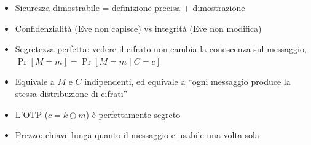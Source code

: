 \begin{itemize}
\tightlist
\item
  Sicurezza dimostrabile = definizione precisa + dimostrazione
\item
  Confidenzialità (Eve non capisce) vs integrità (Eve non modifica)
\item
  Segretezza perfetta: vedere il cifrato non cambia la conoscenza sul messaggio, \(\Pr[M = m] = \Pr[M = m \mid C = c]\)
\item
  Equivale a \(M\) e \(C\) indipendenti, ed equivale a ``ogni messaggio produce la stessa distribuzione di cifrati''
\item
  L'OTP (\(c = k \oplus m\)) è perfettamente segreto
\item
  Prezzo: chiave lunga quanto il messaggio e usabile una volta sola
\end{itemize}
